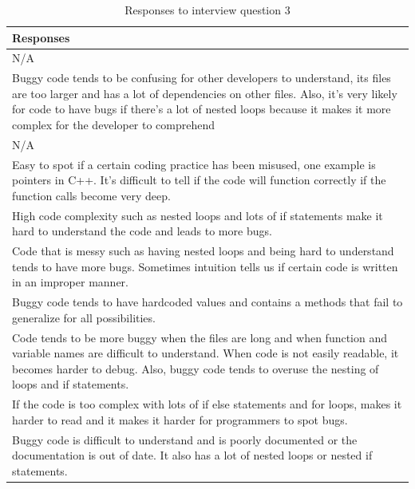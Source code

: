 \documentclass[../main.tex]{subfiles}
\begin{document}
\begin{table}[H]
\centering
\caption{Responses to interview question 3}
    \begin{tabular}{|p{15cm}|}
        \hline
        \textbf{Responses}\\ 
        \hline\hline
        N/A\\
        \hline
        Buggy code tends to be confusing for other developers to understand, its files are too larger and has a lot of dependencies on other files. Also, it's very likely for code to have bugs if there's a lot of nested loops because it makes it more complex for the developer to comprehend\\
        \hline
        N/A\\
        \hline
        Easy to spot if a certain coding practice has been misused, one example is pointers in C++. It's difficult to tell if the code will function correctly if the function calls become very deep.\\
        \hline
        High code complexity such as nested loops and lots of if statements make it hard to understand the code and leads to more bugs.\\
        \hline
        Code that is messy such as having nested loops and being hard to understand tends to have more bugs. Sometimes intuition tells us if certain code is written in an improper manner. \\
        \hline
        Buggy code tends to have hardcoded values and contains a methods that fail to generalize for all possibilities. \\
        \hline
        Code tends to be more buggy when the files are long and when function and variable names are difficult to understand. When code is not easily readable, it becomes harder to debug. Also, buggy code tends to overuse the nesting of loops and if statements.\\
        \hline
        If the code is too complex with lots of if else statements and for loops, makes it harder to read and it makes it harder for programmers to spot bugs. \\
        \hline
        Buggy code is difficult to understand and is poorly documented or the documentation is out of date. It also has a lot of nested loops or nested if statements.\\
        \hline
    \end{tabular}
\label{table:rq4Table3}
\end{table}
\end{document}
